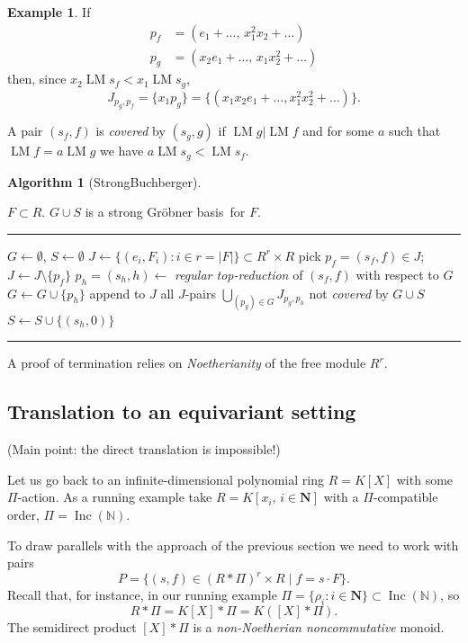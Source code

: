 \documentclass{amsart}
\theoremstyle{definition}
\newtheorem{example}[theorem]{Example}
\newtheorem{algorithm}[theorem]{Algorithm}
\theoremstyle{remark}
\numberwithin{equation}{section}
\newcommand{\B}[1]{\mathbb #1}
\newcommand{\BF}[1]{\mathbf #1}
\newcommand{\Inc}{\operatorname{Inc}(\B N)}
\newcommand{\LM}{\operatorname{LM}}
\newcommand{\NN}{\BF N}
\newcommand{\GB}{{Gr\"obner basis}}
\begin{document}
\begin{example} If 
\begin{align*}
p_f &= (e_1+\ldots,\,x_1^2x_2+\ldots)\\
p_g &= (x_2e_1+\ldots,\,x_1x_2^2+\ldots)
\end{align*}
then, since $x_2\LM s_f < x_1\LM s_g$,
\[
J_{p_g,p_f} = \{x_1p_g\} = \{(x_1x_2e_1+\ldots, x_1^2x_2^2+\ldots)\}.
\]
\end{example}

A pair $(s_f,f)$ is {\em covered} by $(s_g,g)$ if $\LM g | \LM f$ and for some $a$ such that $\LM f = a \LM g$ we have $a\LM s_g < \LM s_f$. 

\begin{algorithm}[StrongBuchberger] \label{alg:StrongBuchberger}
\begin{algorithmic}[1]
\REQUIRE $F \subset R$.
\ENSURE $G \cup S$ is a strong \GB\ for $F$.
\smallskip \hrule \smallskip

\STATE $G\gets \emptyset$, $S\gets \emptyset$ 
\STATE $J\gets \{(e_i,F_i):i\in r=|F|\} \subset R^r\times R$ 
	\STATE pick $p_f = (s_f,f) \in J$; $J\gets J\setminus\{p_f\}$
	\STATE $p_h=(s_h,h) \gets$ {\em regular top-reduction} of $(s_f,f)$ with respect to $G$
		\STATE $G\gets G\cup \{p_h\}$
		\STATE append to $J$ all $J$-pairs $\bigcup_{(p_g)\in G}J_{p_g,p_h}$ not {\em covered} by $G \cup S$ 
        \ELSE 
                \STATE $S\gets S\cup\{(s_h,0)\}$
	\ENDIF
\ENDWHILE
\smallskip \hrule \smallskip
\end{algorithmic}
\end{algorithm}

A proof of termination relies on {\em Noetherianity} of the free module $R^r$. 

\subsection{Translation to an equivariant setting}
(Main point: the direct translation is impossible!)


Let us go back to an infinite-dimensional polynomial ring $R=K[X]$ with some $\Pi$-action. As a running example take $R=K[x_i,\, i\in\NN]$ with a $\Pi$-compatible order, $\Pi=\Inc$.

To draw parallels with the approach of the previous section we need to work with pairs 
\[
P = \{(s,f)\in (R*\Pi)^r\times R \mid f=s\cdot F\}.
\]
Recall that, for instance, in our running example $\Pi=\{\rho_i:i\in\NN\} \subset \Inc$, so \[R*\Pi = K[X]*\Pi = K([X]*\Pi).\] 
The semidirect product $[X]*\Pi$ is a {\em non-Noetherian noncommutative} monoid.
\end{document}
